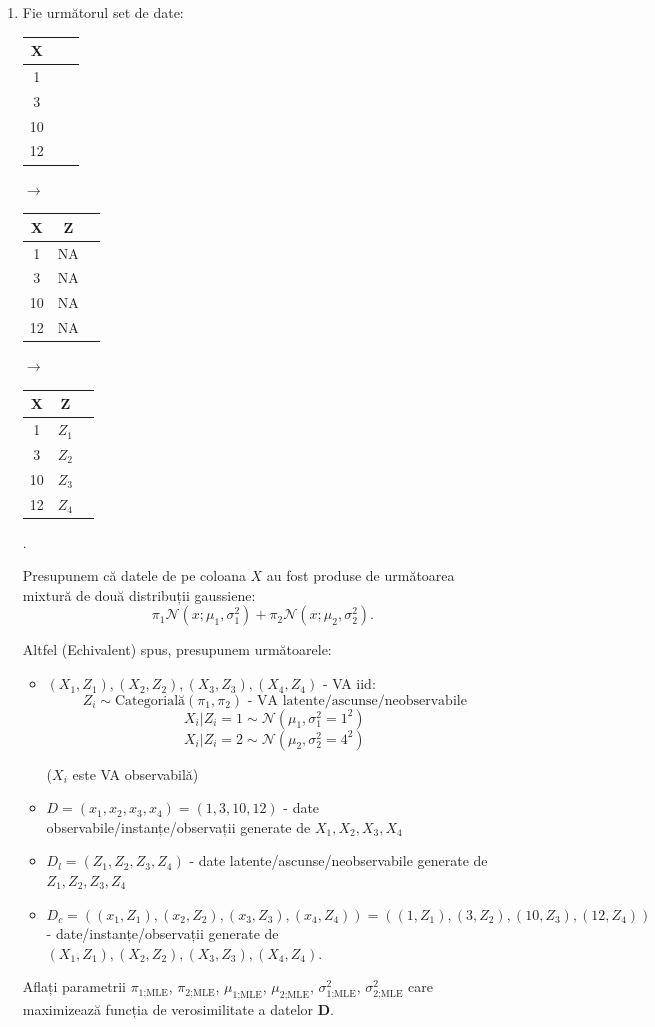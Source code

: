 \documentclass[12pt]{article}
\begin{document}
\begin{enumerate}
\begin{enumerate}
			\item Fie următorul set de date: 
			\begin{tabular}{ |c|c|c| } 
				\hline
				X \\ 
				\hline
				1 \\ 
				3\\ 
				10\\
				12\\
				\hline
			\end{tabular} $\rightarrow$ \begin{tabular}{ |c|c|c| } 
				\hline
				X & Z\\ 
				\hline
				1 & NA \\ 
				3 & NA\\ 
				10 & NA\\
				12 & NA\\
				\hline
			\end{tabular} $\rightarrow$ \begin{tabular}{ |c|c|c| } 
				\hline
				X & Z\\ 
				\hline
				1 & $Z_1$ \\ 
				3 & $Z_2$\\ 
				10 & $Z_3$\\
				12 & $Z_4$\\
				\hline
			\end{tabular}. 
			
			Presupunem că datele de pe coloana $X$ au fost produse de următoarea mixtură de două distribuții gaussiene:
			$$\pi_1\mathcal{N}(x;\mu_1,\sigma_1^2) + \pi_2\mathcal{N}(x;\mu_2,\sigma_2^2).$$
			
			Altfel (Echivalent) spus, presupunem următoarele:
			\begin{itemize}
				\item $(X_1,Z_1), (X_2,Z_2), (X_3,Z_3), (X_4,Z_4)$ - VA iid: 
				$$Z_i \sim \text{Categorială}\left(\pi_1,\pi_2\right)\text{ - VA latente/ascunse/neobservabile}$$
				$$X_i|Z_i = 1 \sim \mathcal{N}(\mu_1,\sigma_1^2 = 1^2)$$
				$$X_i|Z_i = 2 \sim \mathcal{N}(\mu_2,\sigma_2^2 = 4^2)$$
				\begin{center}
					($X_i$ este VA observabilă)
				\end{center}
				\item $D = (x_1,x_2,x_3,x_4) = (1,3,10,12)$ - date observabile/instanțe/observații generate de $X_1,X_2,X_3,X_4$
				\item $D_l = (Z_1,Z_2,Z_3,Z_4)$ - date latente/ascunse/neobservabile generate de $Z_1, Z_2, Z_3, Z_4$
				\item $D_c=((x_1,Z_1),(x_2,Z_2),(x_3,Z_3),(x_4,Z_4)) = ((1,Z_1),(3,Z_2),(10,Z_3),(12,Z_4))$ - date/instanțe/observații generate de $(X_1,Z_1),(X_2,Z_2),(X_3,Z_3),(X_4,Z_4)$.
			\end{itemize}
			Aflați parametrii $\pi_\text{1;MLE}$, $\pi_\text{2;MLE}$, $\mu_\text{1;MLE}$, $\mu_\text{2;MLE}$, $\sigma^2_\text{1;MLE}$, $\sigma^2_\text{2;MLE}$ care maximizează funcția de verosimilitate a datelor \textbf{D}.
		\end{enumerate}
		
		
	\end{enumerate}
	
\end{document}
